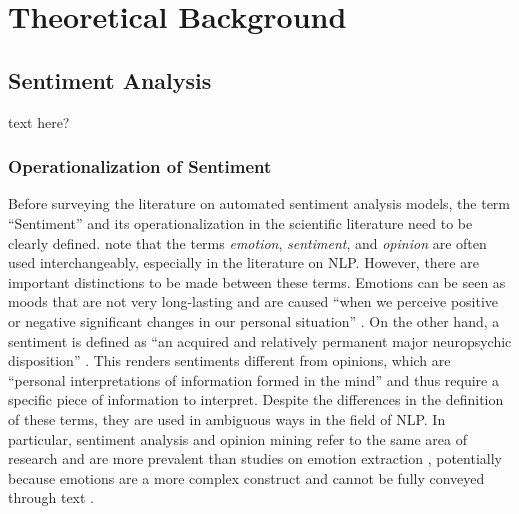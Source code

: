 \section{Theoretical Background}



\subsection{Sentiment Analysis}  %
text here?
\subsubsection{Operationalization of Sentiment}
Before surveying the literature on automated sentiment analysis models, the term ``Sentiment'' and its operationalization in the scientific literature need to be clearly defined.  note that the terms \emph{emotion}, \emph{sentiment}, and \emph{opinion} are often used interchangeably, especially in the literature on NLP. However, there are important distinctions to be made between these terms. Emotions can be seen as moods that are not very long-lasting and are caused ``when we perceive positive or negative significant changes in our personal situation'' . On the other hand, a sentiment is defined as ``an acquired and relatively permanent major neuropsychic disposition'' \cite[p.~16]{cattell1940sentiment}. This renders sentiments different from opinions, which are ``personal interpretations of information formed in the mind'' \cite[p.~4]{munezero2014they} and thus require a specific piece of information to interpret. %
Despite the differences in the definition of these terms, they are used in ambiguous ways in the field of NLP. In particular, sentiment analysis and opinion mining refer to the same area of research \cite{liu2012book} and are more prevalent than studies on emotion extraction , potentially because emotions are a more complex construct and cannot be fully conveyed through text .

